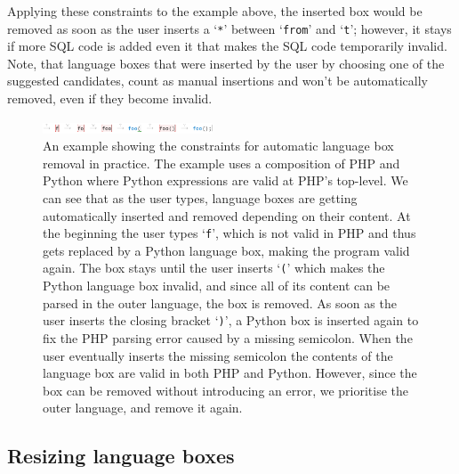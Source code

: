 \documentclass[sigplan,screen]{acmart}\settopmatter{printfolios=true,printccs=false,printacmref=false}
\newcommand{\qtt}[1]{`\texttt{#1}'\xspace}
\begin{document}
Applying these constraints to the example above, the inserted box would be
removed as soon as the user inserts a \qtt{*} between \qtt{from} and
\qtt{t}; however, it stays if more SQL code is added even it that makes the
SQL code temporarily invalid. Note, that language boxes that were inserted by the
user by choosing one of the suggested candidates, count as manual insertions
and won't be automatically removed, even if they become invalid.

\begin{figure}
\begin{center}
\vspace{0.8em}
\includegraphics[width=0.45\textwidth]{images/autoremove_foo.png}
\vspace{-0.8em}
\end{center}
\caption{An example showing the constraints for automatic language box removal in practice.
The example uses a composition of PHP and Python where Python expressions are valid at
PHP's top-level.
We can see that as the user types, language boxes are getting automatically
inserted and removed depending on their content. At the beginning the user types
\qtt{f}, which is not valid in PHP and thus gets replaced by a Python
language box, making the program valid again. The box stays until the user
inserts \qtt{(} which makes the Python language box invalid, and since all of
its content can be parsed in the outer language, the box is removed.
As soon as the user inserts the closing bracket \qtt{)}, a Python box is
inserted again to fix the PHP parsing error caused by a missing semicolon. When the
user eventually inserts the missing semicolon the contents of the language box
are valid in both PHP and Python. However, since the box can be removed
without introducing an error, we prioritise the outer
language, and remove it again.}
\label{fig_autoremoval}
\end{figure}


\subsection{Resizing language boxes}
\end{document}
